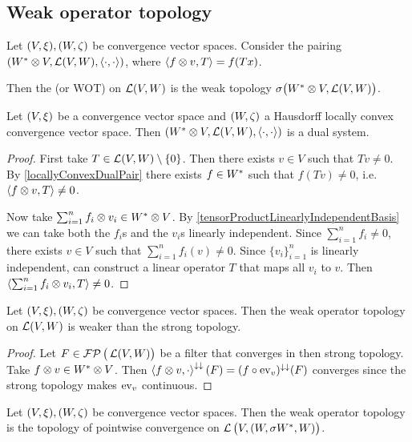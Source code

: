 \subsection{Weak operator topology}
\begin{definition}
Let $\sSet{V, \xi}, \sSet{W,\zeta}$ be convergence vector spaces. Consider the pairing $\sSet{\dual{W}\otimes V, \contLin(V,W), \pair{\cdot, \cdot}}$, where $\left\langle f\otimes v, T \right\rangle = f(Tx)$.

Then the  (or WOT) on $\operatorname{\mathcal{L}}(V,W)$ is the weak topology $\sigma\big({W}^*\otimes V, \operatorname{\mathcal{L}}(V,W)\big)$.
\end{definition}
\begin{lemma}
Let $\sSet{V, \xi}$ be a convergence vector space and $\sSet{W,\zeta}$ a Hausdorff locally convex convergence vector space. Then $\sSet{\dual{W}\otimes V, \contLin(V,W), \pair{\cdot, \cdot}}$ is a dual system. 
\end{lemma}
\begin{proof}
First take $T\in \operatorname{\mathcal{L}}(V,W)\setminus \{0\}$. Then there exists $v\in V$ such that $Tv \neq 0$. By \ref{locallyConvexDualPair} there exists $f\in {W}^*$ such that $f(Tv) \neq 0$, i.e. $\left\langle f\otimes v, T \right\rangle \neq 0$.

Now take $\sum_{i=1}^nf_i\otimes v_i \in {W}^*\otimes V$. By \ref{tensorProductLinearlyIndependentBasis} we can take both the $f_i$s and the $v_i$s linearly independent. Since $\sum_{i=1}^n f_i \neq 0$, there exists $v\in V$ such that $\sum_{i=1}^n f_i(v) \neq 0$. Since $\{v_i\}_{i=1}^n$ is linearly independent, can construct a linear operator $T$ that maps all $v_i$ to $v$. Then $\left\langle \sum_{i=1}^nf_i\otimes v_i, T \right\rangle \neq 0$.
\end{proof}

\begin{lemma}
Let $\sSet{V, \xi}, \sSet{W,\zeta}$ be convergence vector spaces. Then the weak operator topology on $\operatorname{\mathcal{L}}(V,W)$ is weaker than the strong topology.
\end{lemma}
\begin{proof}
Let $F\in\operatorname{\mathcal{FP}}\big(\operatorname{\mathcal{L}}(V,W)\big)$ be a filter that converges in then strong topology. Take $f\otimes v\in {W}^*\otimes V$. Then $\left\langle f\otimes v,\cdot \right\rangle^{\downarrow\downarrow}(F) = (f\circ \operatorname{ev}_v)^{\downarrow\downarrow}(F)$ converges since the strong topology makes $\operatorname{ev}_v$ continuous.
\end{proof}

\begin{lemma}
Let $\sSet{V, \xi}, \sSet{W,\zeta}$ be convergence vector spaces. Then the weak operator topology is the topology of pointwise convergence on $\contLin\big(V, \sSet{W, \sigma{\dual{W}, W}}\big)$.
\end{lemma}

